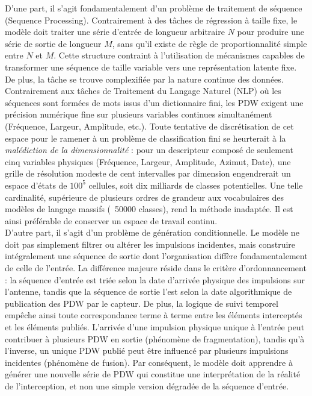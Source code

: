 D'une part, il s'agit fondamentalement d'un problème de traitement de séquence (Sequence Processing). Contrairement à des tâches de régression à taille fixe, le modèle doit traiter une série d'entrée de longueur arbitraire $N$ pour produire une série de sortie de longueur $M$, sans qu'il existe de règle de proportionnalité simple entre $N$ et $M$. Cette structure contraint à l'utilisation de mécanismes capables de transformer une séquence de taille variable vers une représentation latente fixe. De plus, la tâche se trouve complexifiée par la nature continue des données. Contrairement aux tâches de Traitement du Langage Naturel (NLP) où les séquences sont formées de mots issus d'un dictionnaire fini, les PDW exigent une précision numérique fine sur plusieurs variables continues simultanément (Fréquence, Largeur, Amplitude, etc.). Toute tentative de discrétisation de cet espace pour le ramener à un problème de classification fini se heurterait à la \textit{malédiction de la dimensionnalité} \cite{bellman_dynamic_1966} : pour un descripteur composé de seulement cinq variables physiques (Fréquence, Largeur, Amplitude, Azimut, Date), une grille de résolution modeste de cent intervalles par dimension engendrerait un espace d'états de $100^5$ cellules, soit dix milliards de classes potentielles. Une telle cardinalité, supérieure de plusieurs ordres de grandeur aux vocabulaires des modèles de langage massifs (~50000 classes), rend la méthode inadaptée. Il est ainsi préférable de conserver un espace de travail continu.\\

D'autre part, il s'agit d'un problème de génération conditionnelle. Le modèle ne doit pas simplement filtrer ou altérer les impulsions incidentes, mais construire intégralement une séquence de sortie dont l'organisation diffère fondamentalement de celle de l'entrée. La différence majeure réside dans le critère d'ordonnancement : la séquence d'entrée est triée selon la date d'arrivée physique des impulsions sur l'antenne, tandis que la séquence de sortie l'est selon la date algorithmique de publication des PDW par le capteur.
De plus, la logique de suivi temporel empêche ainsi toute correspondance terme à terme entre les éléments interceptés et les éléments publiés. L'arrivée d'une impulsion physique unique à l'entrée peut contribuer à plusieurs PDW en sortie (phénomène de fragmentation), tandis qu'à l'inverse, un unique PDW publié peut être influencé par plusieurs impulsions incidentes (phénomène de fusion). Par conséquent, le modèle doit apprendre à générer une nouvelle série de PDW qui constitue une interprétation de la réalité de l'interception, et non une simple version dégradée de la séquence d'entrée.\\ 

